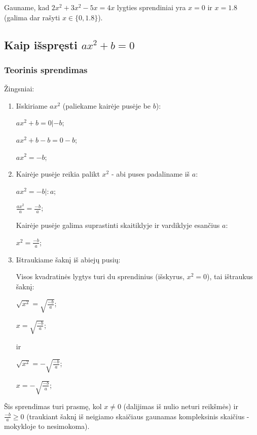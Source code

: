 \documentclass[a4paper]{article}
\begin{document}
Gauname, kad $ 2x^2 + 3x^2 - 5x = 4x $ lygties sprendiniai yra $x=0$ ir $ x =
      1.8 $ (galima dar rašyti $ x \in \{0, 1.8\} $).

\subsection{Kaip išspręsti $ ax^{2}+b=0 $}

\subsubsection{Teorinis sprendimas}

Žingsniai:
\begin{enumerate}

      \item  Išskiriame $ ax^{2} $ (paliekame kairėje pusėje be $ b $):

            $ ax^{2}+b=0 | -b $;

            $ ax^{2}+b-b=0-b $;

            $ ax^{2}=-b $;

      \item Kairėje pusėje reikia palikt $ x^2 $ - abi puses padaliname iš $ a
            $:

            $ ax^{2}=-b |:a $;

            $ \frac{ax^{2}}{a}=\frac{-b}{a}$;

            Kairėje pusėje galima suprastinti skaitiklyje ir vardiklyje
            esančius
            $ a $:

            $ x^{2}=\frac{-b}{a}$;

      \item Ištraukiame šaknį iš abiejų pusių:

            Visos kvadratinės lygtys turi du sprendinius (išskyrus, $ x^2=0 $),
            tai ištraukus šaknį:

            $ \sqrt{x^{2}}=\sqrt{\frac{-b}{a}}$;

            $ x=\sqrt{\frac{-b}{a}}$;

            ir

            $ \sqrt{x^{2}}=-\sqrt{\frac{-b}{a}}$;

            $ x=-\sqrt{\frac{-b}{a}}$;

\end{enumerate}

Šis sprendimas turi prasmę, kol $ x \neq 0 $ (dalijimas iš nulio neturi
reikšmės) ir $ \frac{-b}{a} \ge 0 $ (traukiant šaknį iš neigiamo skaičiaus
gaunamas kompleksinis skaičius - mokykloje to nesimokoma).
\end{document}
